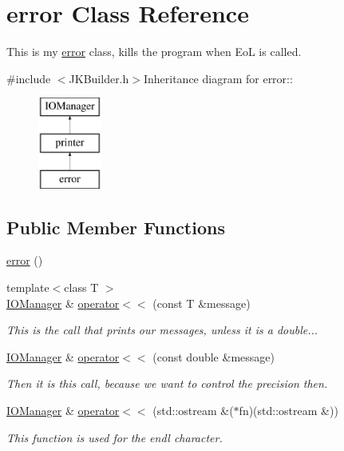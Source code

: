 \hypertarget{classJKBuilder_1_1error}{
\section{error Class Reference}
\label{classJKBuilder_1_1error}
}


This is my \hyperlink{classJKBuilder_1_1error}{error} class, kills the program when EoL is called.  


{\ttfamily \#include $<$JKBuilder.h$>$}Inheritance diagram for error::\begin{figure}[H]
\begin{center}
\leavevmode
\includegraphics[height=3cm]{classJKBuilder_1_1error}
\end{center}
\end{figure}
\subsection*{Public Member Functions}
\begin{DoxyCompactItemize}
\item 
\hyperlink{classJKBuilder_1_1error_a43b8d30b879d4f09ceb059b02af2bc02}{error} ()
\item 
{\footnotesize template$<$class T $>$ }\\\hyperlink{classJKBuilder_1_1IOManager}{IOManager} \& \hyperlink{classJKBuilder_1_1IOManager_a505a35212a21e4884ed24b021c0add4b}{operator$<$$<$} (const T \&message)
\begin{DoxyCompactList}\small\item\em This is the call that prints our messages, unless it is a double... \item\end{DoxyCompactList}\item 
\hyperlink{classJKBuilder_1_1IOManager}{IOManager} \& \hyperlink{classJKBuilder_1_1IOManager_a127779d1803b6ffe9e44a3a36e46910e}{operator$<$$<$} (const double \&message)
\begin{DoxyCompactList}\small\item\em Then it is this call, because we want to control the precision then. \item\end{DoxyCompactList}\item 
\hyperlink{classJKBuilder_1_1IOManager}{IOManager} \& \hyperlink{classJKBuilder_1_1IOManager_a4ab394f377d37c6598659317320ec38c}{operator$<$$<$} (std::ostream \&($\ast$fn)(std::ostream \&))
\begin{DoxyCompactList}\small\item\em This function is used for the endl character. \item\end{DoxyCompactList}\end{DoxyCompactItemize}
